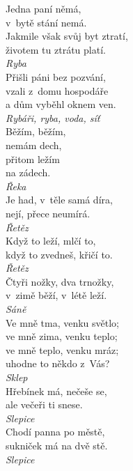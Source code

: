 \begin{multicols}{3}
\noindent
Jedna paní němá,\\
v~bytě stání nemá.\\
Jakmile však svůj byt ztratí,\\
životem tu ztrátu platí.\\[1 mm]
{\sl Ryba}\\

\noindent
Přišli páni bez pozvání,\\
vzali z~domu hospodáře\\
a dům vyběhl oknem ven.\\[1 mm]
{\sl Rybáři, ryba, voda, síť}\\

\noindent
Běžím, běžím,\\
nemám dech,\\
přitom ležím\\
na zádech.\\[1 mm]
{\sl Řeka}\\

\noindent
Je had, v~těle samá díra,\\
nejí, přece neumírá.\\[1 mm]
{\sl Řetěz}\\

\noindent
Když to leží, mlčí to,\\
když to zvedneš, křičí to.\\[1 mm]
{\sl Řetěz}\\

\noindent
Čtyři nožky, dva trnožky,\\
v~zimě běží, v~létě leží.\\[1 mm]
{\sl Sáně}\\

\noindent
Ve mně tma, venku světlo;\\
ve mně zima, venku teplo;\\
ve mně teplo, venku mráz;\\
uhodne to někdo z~Vás?\\[1 mm]
{\sl Sklep}\\

\noindent
Hřebínek má, nečeše se,\\
ale večeři ti snese.\\[1 mm]
{\sl Slepice}\\

\noindent
Chodí panna po městě,\\
sukniček má na dvě stě.\\[1 mm]
{\sl Slepice}\\


\end{multicols}

